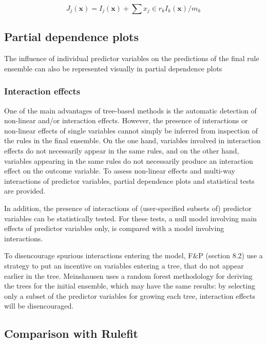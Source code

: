 \documentclass[nobf,doc]{apa}
\begin{document}
\begin{equation}
	J_j(\mathbf{x}) = I_j(\mathbf{x}) + \sum{x_j \in r_k}{I_k(\mathbf{x}) / m_k} 
\end{equation} 


\subsection{Partial dependence plots}

The influence of individual predictor variables on the predictions of the final rule ensemble can also be represented visually in partial dependence plots

\subsubsection{Interaction effects}

One of the main advantages of tree-based methods is the automatic detection of non-linear and/or interaction effects. However, the presence of interactions or non-linear effects of single variables cannot simply be inferred from inspection of the rules in the final ensemble. On the one hand, variables involved in interaction effects do not necessarily appear in the same rules, and on the other hand, variables appearing in the same rules do not necessarily produce an interaction effect on the outcome variable. To assess non-linear effects and multi-way interactions of predictor variables, partial dependence plots and statistical tests are provided.

In addition, the presence of interactions of (user-specified subsets of) predictor variables can be statistically tested. For these tests, a null model involving main effects of predictor variables only, is compared with a model involving interactions. 

To disencourage spurious interactions entering the model, F\&P (section 8.2) use a strategy to put an incentive on variables entering a tree, that do not appear earlier in the tree. Meinshausen uses a random forest methodology for deriving the trees for the initial ensemble, which may have the same results: by selecting only a subset of the predictor variables for growing each tree, interaction effects will be disencouraged.


\subsection{Comparison with Rulefit}
\end{document}
